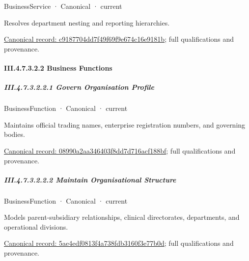 \label{element:c9187704dd7f49f69f9e674c16e9181b}
{\small BusinessService · Canonical · current}\par

Resolves department nesting and reporting hierarchies.


{\footnotesize \href{../../../../../../../../continuum/business/business-service/c9187704dd7f49f69f9e674c16e9181b.md}{Canonical record: c9187704dd7f49f69f9e674c16e9181b}; full qualifications and provenance.}\par
\paragraph*{III.4.7.3.2.2 Business Functions}
\label{navigation:III.4.7.3.2.2}

\subparagraph*{III.4.7.3.2.2.1 Govern Organisation Profile}
\label{navigation:III.4.7.3.2.2.1}

\label{element:08990a2aa346403f8dd7d716acf188bf}
{\small BusinessFunction · Canonical · current}\par

Maintains official trading names, enterprise registration numbers, and governing bodies.


{\footnotesize \href{../../../../../../../../continuum/business/business-function/08990a2aa346403f8dd7d716acf188bf.md}{Canonical record: 08990a2aa346403f8dd7d716acf188bf}; full qualifications and provenance.}\par
\subparagraph*{III.4.7.3.2.2.2 Maintain Organisational Structure}
\label{navigation:III.4.7.3.2.2.2}

\label{element:5ae4edf0813f4a738fdb3160f3e77b0d}
{\small BusinessFunction · Canonical · current}\par

Models parent-subsidiary relationships, clinical directorates, departments, and operational divisions.


{\footnotesize \href{../../../../../../../../continuum/business/business-function/5ae4edf0813f4a738fdb3160f3e77b0d.md}{Canonical record: 5ae4edf0813f4a738fdb3160f3e77b0d}; full qualifications and provenance.}\par
